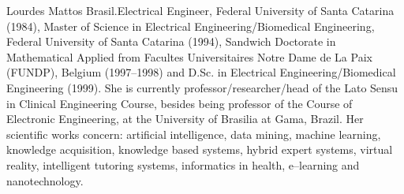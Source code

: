 \documentclass[journal]{IEEEtran}
\begin{document}
\begin{IEEEbiography}{Lourdes Mattos Brasil}.Electrical Engineer, Federal University of
Santa Catarina (1984), Master of Science in Electrical
Engineering/Biomedical Engineering, Federal University of Santa
Catarina (1994), Sandwich Doctorate in Mathematical Applied from
Facultes Universitaires Notre Dame de La Paix (FUNDP), Belgium
(1997–1998) and D.Sc. in Electrical Engineering/Biomedical Engineering
(1999). She is currently professor/researcher/head of the Lato Sensu
in Clinical Engineering Course, besides being professor of the Course
of Electronic Engineering, at the University of Brasilia at Gama,
Brazil. Her scientific works concern: artificial intelligence, data
mining, machine learning, knowledge acquisition, knowledge based
systems, hybrid expert systems, virtual reality, intelligent tutoring
systems, informatics in health, e–learning and nanotechnology.
\end{IEEEbiography}







\end{document}
